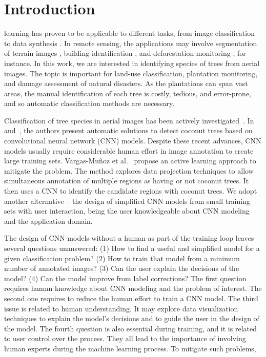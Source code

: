 \documentclass[journal, twoside]{IEEEtran}
\begin{document}
\section{Introduction}
 learning has proven to be applicable to different tasks, from image classification to data synthesis \cite{goodfellow2016deep}. In remote sensing, the applications may involve segmentation of terrain images \cite{kemker2018algorithms, kampffmeyer2016semantic}, building identification \cite{xu2018building, lu2018detecting, liu2018multilevel}, and deforestation monitoring \cite{bragilevsky2017deep}, for instance. In this work, we are interested in identifying species of trees from aerial images. The topic is important for land-use classification, plantation monitoring, and damage assessment of natural disasters. As the plantations can span vast areas, the manual identification of each tree is costly, tedious, and error-prone, and so automatic classification methods are necessary. 

Classification of tree species in aerial images has been actively investigated~\cite{fassnacht2016review}. In \cite{puttemans2018comparing} and~\cite{aparna2018cnn}, the authors present automatic solutions to detect coconut trees based on convolutional neural network (CNN) models. Despite these recent advances, CNN models usually require considerable human effort in image annotation to create large training sets. Vargas-Muñoz et al.~\cite{8899005} propose an active learning approach to mitigate the problem. The method explores data projection techniques to allow simultaneous annotation of multiple regions as having or not coconut trees. It then uses a CNN to identify the candidate regions with coconut trees. We adopt another alternative -- the design of simplified CNN models from small training sets with user interaction, being the user knowledgeable about CNN modeling and the application domain.

The design of CNN models without a human as part of the training loop leaves several questions unanswered: (1) How to find a useful and simplified model for a given classification problem? (2) How to train that model from a minimum number of annotated images?  (3) Can the user explain the decisions of the model? (4) Can the model improve from label corrections? The first question requires human knowledge about CNN modeling and the problem of interest. The second one requires to reduce the human effort to train a CNN model. The third issue is related to human understanding. It may explore data visualization techniques to explain the model's decisions and to guide the user in the design of the model. The fourth question is also essential during training, and it is related to user control over the process. They all lead to the importance of involving human experts during the machine learning process. To mitigate such problems, 
\end{document}
